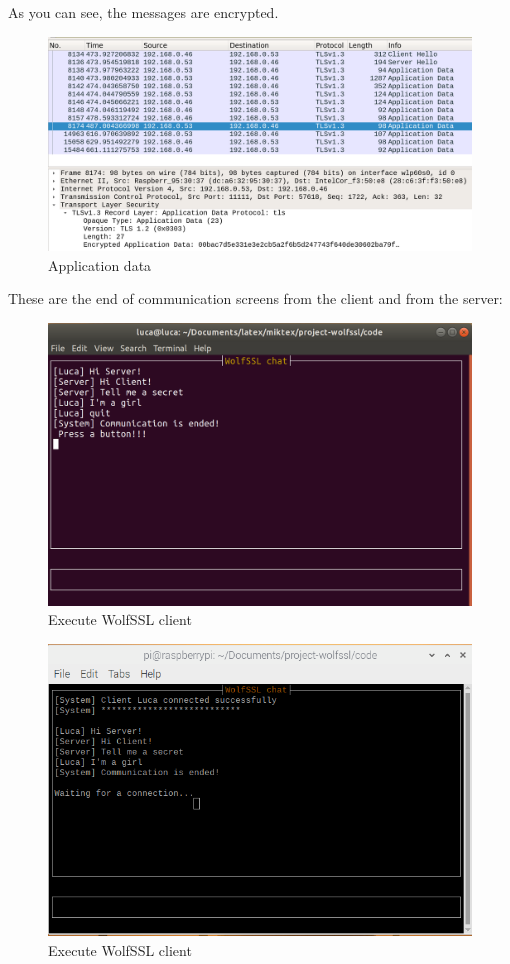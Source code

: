 \documentclass[a4paper,12pt]{report}
\begin{document}
As you can see, the messages are encrypted.
\begin{figure}[H]
    \centering
    \includegraphics[scale=0.248]{./code/img/application_data.png}
    \caption{Application data}
    \label{fig:galaxy}
\end{figure}
\pagebreak
These are the end of communication screens from the client and from the server:
\begin{figure}[H]
    \centering
    \includegraphics[scale=0.2]{./code/img/3-client.png}
    \caption{Execute WolfSSL client}
    \label{fig:galaxy}
\end{figure}
\begin{figure}[H]
    \centering
    \includegraphics[scale=0.45]{./code/img/4-server.png}
    \caption{Execute WolfSSL client}
    \label{fig:galaxy}
\end{figure}
\end{document}
